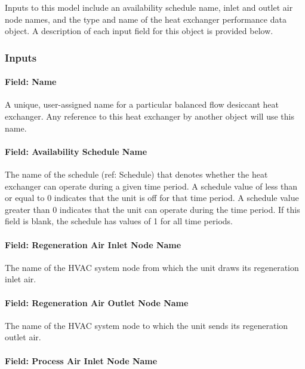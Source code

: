 Inputs to this model include an availability schedule name, inlet and outlet air node names, and the type and name of the heat exchanger performance data object. A description of each input field for this object is provided below.

\subsubsection{Inputs}\label{inputs-2-018}

\paragraph{Field: Name}\label{field-name-2-017}

A unique, user-assigned name for a particular balanced flow desiccant heat exchanger. Any reference to this heat exchanger by another object will use this name.

\paragraph{Field: Availability Schedule Name}\label{field-availability-schedule-name-2-003}

The name of the schedule (ref: Schedule) that denotes whether the heat exchanger can operate during a given time period. A schedule value of less than or equal to 0 indicates that the unit is off for that time period. A schedule value greater than 0 indicates that the unit can operate during the time period. If this field is blank, the schedule has values of 1 for all time periods.

\paragraph{Field: Regeneration Air Inlet Node Name}\label{field-regeneration-air-inlet-node-name-000}

The name of the HVAC system node from which the unit draws its regeneration inlet air.

\paragraph{Field: Regeneration Air Outlet Node Name}\label{field-regeneration-air-outlet-node-name}

The name of the HVAC system node to which the unit sends its regeneration outlet air.

\paragraph{Field: Process Air Inlet Node Name}\label{field-process-air-inlet-node-name-000}

